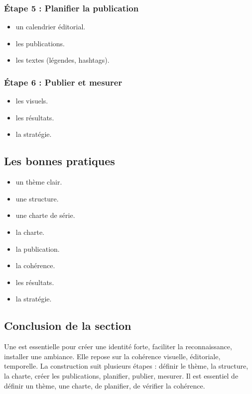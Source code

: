 \subsubsection{Étape 5 : Planifier la publication}

\begin{itemize}
    \item {} un calendrier éditorial.
    \item {} les publications.
    \item {} les textes (légendes, hashtags).
\end{itemize}

\subsubsection{Étape 6 : Publier et mesurer}

\begin{itemize}
    \item {} les visuels.
    \item {} les résultats.
    \item {} la stratégie.
\end{itemize}

\subsection{Les bonnes pratiques}

\begin{itemize}
    \item {} un thème clair.
    \item {} une structure.
    \item {} une charte de série.
    \item {} la charte.
    \item {} la publication.
    \item {} la cohérence.
    \item {} les résultats.
    \item {} la stratégie.
\end{itemize}

\subsection*{Conclusion de la section}

Une  est essentielle pour créer une identité forte, faciliter la reconnaissance, installer une ambiance. Elle repose sur la cohérence visuelle, éditoriale, temporelle. La construction suit plusieurs étapes : définir le thème, la structure, la charte, créer les publications, planifier, publier, mesurer. Il est essentiel de définir un thème, une charte, de planifier, de vérifier la cohérence.

